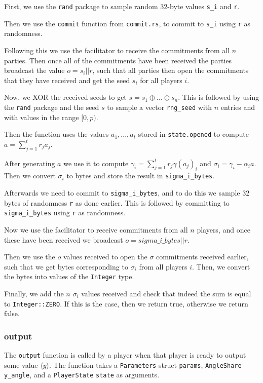 \documentclass[../main.tex]{subfiles}
\begin{document}
First, we use the \lstinline{rand} package to sample random $32$-byte values  \lstinline{s_i} and \lstinline{r}.

Then we use the \lstinline{commit} function from \lstinline{commit.rs}, to commit to \lstinline{s_i} using \lstinline{r} as randomness.

Following this we use the facilitator to receive the commitments from all $n$ parties. Then once all of the commitments have been received the parties broadcast the value $o = s_i || r$, such that all parties then open the commitments that they have received and get the seed $s_i$ for all players $i$.

Now, we XOR the received seeds to get $s = s_1 \oplus ... \oplus s_n$. This is followed by using the \lstinline{rand} package and the seed $s$ to sample a vector \lstinline{rng_seed} with $n$ entries and with values in the range $[0, p)$.

Then the function uses the values $a_1, ..., a_t$ stored in \lstinline{state.opened} to compute $a = \sum^t_{j = 1} r_j a_j$. %

After generating $a$ we use it to compute $\gamma_i = \sum^t_{j = 1} r_j \gamma(a_j)_i$ and $\sigma_i = \gamma_i - \alpha_i a$. Then we convert $\sigma_i$ to bytes and store the result in \lstinline{sigma_i_bytes}.

Afterwards we need to commit to \lstinline{sigma_i_bytes}, and to do this we sample $32$ bytes of randomness \lstinline{r} as done earlier. This is followed by committing to \lstinline{sigma_i_bytes} using \lstinline{r} as randomness.

Now we use the facilitator to receive commitments from all $n$ players, and once these have been received we broadcast $o = sigma\_i\_bytes || r$.

Then we use the $o$ values received to open the $\sigma$ commitments received earlier, such that we get bytes corresponding to $\sigma_i$ from all players $i$. Then, we convert the bytes into values of the \lstinline{Integer} type.

Finally, we add the $n$ $\sigma_i$ values received and check that indeed the sum is equal to \lstinline{Integer::ZERO}. If this is the case, then we return true, otherwise we return false.

\subsubsection{output}
The \lstinline{output} function is called by a player when that player is ready to output some value $\langle y \rangle$. The function takes a \lstinline{Parameters} struct \lstinline{params}, \lstinline{AngleShare} \lstinline{y_angle}, and a \lstinline{PlayerState} \lstinline{state} as arguments.
\end{document}
